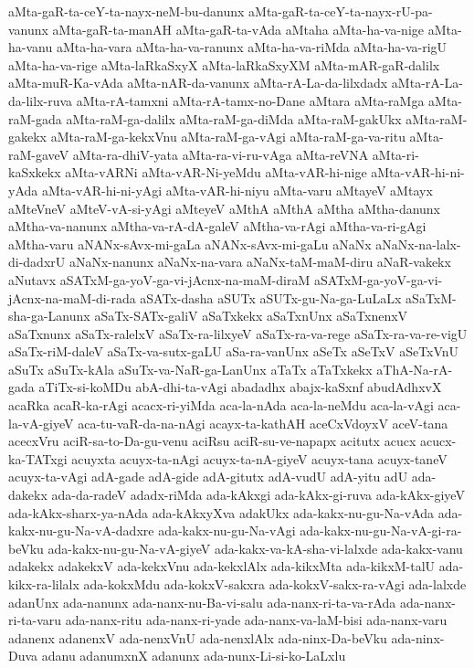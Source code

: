 {aMta-gaR-ta-ceY-ta-nayx-neM-bu-danunx
aMta-gaR-ta-ceY-ta-nayx-rU-pa-vanunx
aMta-gaR-ta-manAH
aMta-gaR-ta-vAda
aMtaha
aMta-ha-va-nige
aMta-ha-vanu
aMta-ha-vara
aMta-ha-va-ranunx
aMta-ha-va-riMda
aMta-ha-va-rigU
aMta-ha-va-rige
aMta-laRkaSxyX
aMta-laRkaSxyXM
aMta-mAR-gaR-dalilx
aMta-muR-Ka-vAda
aMta-nAR-da-vanunx
aMta-rA-La-da-lilxdadx
aMta-rA-La-da-lilx-ruva
aMta-rA-tamxni
aMta-rA-tamx-no-Dane
aMtara
aMta-raMga
aMta-raM-gada
aMta-raM-ga-dalilx
aMta-raM-ga-diMda
aMta-raM-gakUkx
aMta-raM-gakekx
aMta-raM-ga-kekxVnu
aMta-raM-ga-vAgi
aMta-raM-ga-va-ritu
aMta-raM-gaveV
aMta-ra-dhiV-yata
aMta-ra-vi-ru-vAga
aMta-reVNA
aMta-ri-kaSxkekx
aMta-vARNi
aMta-vAR-Ni-yeMdu
aMta-vAR-hi-nige
aMta-vAR-hi-ni-yAda
aMta-vAR-hi-ni-yAgi
aMta-vAR-hi-niyu
aMta-varu
aMtayeV
aMtayx
aMteVneV
aMteV-vA-si-yAgi
aMteyeV
aMthA
aMthA‌
aMtha
aMtha-danunx
aMtha-va-nanunx
aMtha-va-rA-dA-galeV
aMtha-va-rAgi
aMtha-va-ri-gAgi
aMtha-varu
aNANx-sAvx-mi-gaLa
aNANx-sAvx-mi-gaLu
aNaNx
aNaNx-na-lalx-di-dadxrU
aNaNx-nanunx
aNaNx-na-vara
aNaNx-taM-maM-diru
aNaR-vakekx
aNutavx
aSATxM-ga-yoV-ga-vi-jAcnx-na-maM-diraM
aSATxM-ga-yoV-ga-vi-jAcnx-na-maM-di-rada
aSATx-dasha
aSUTx
aSUTx-gu-Na-ga-LuLaLx
aSaTxM-sha-ga-Lanunx
aSaTx-SATx-galiV
aSaTxkekx
aSaTxnUnx
aSaTxnenxV
aSaTxnunx
aSaTx-ralelxV
aSaTx-ra-lilxyeV
aSaTx-ra-va-rege
aSaTx-ra-va-re-vigU
aSaTx-riM-daleV
aSaTx-va-sutx-gaLU
aSa-ra-vanUnx
aSeTx
aSeTxV
aSeTxVnU
aSuTx
aSuTx-kAla
aSuTx-va-NaR-ga-LanUnx
aTaTx
aTaTxkekx
aThA-Na-rA-gada
aTiTx-si-koMDu
abA-dhi-ta-vAgi
abadadhx
abajx-kaSxnf
abudAdhxvX
acaRka
acaR-ka-rAgi
acacx-ri-yiMda
aca-la-nAda
aca-la-neMdu
aca-la-vAgi
aca-la-vA-giyeV
aca-tu-vaR-da-na-nAgi
acayx-ta-kathAH
aceCxVdoyxV
aceV-tana
acecxVru
aciR-sa-to-Da-gu-venu
aciRsu
aciR-su-ve-napapx
acitutx
acucx
acucx-ka-TATxgi
acuyxta
acuyx-ta-nAgi
acuyx-ta-nA-giyeV
acuyx-tana
acuyx-taneV
acuyx-ta-vAgi
adA-gade
adA-gide
adA-gitutx
adA-vudU
adA-yitu
adU
ada-dakekx
ada-da-radeV
adadx-riMda
ada-kAkxgi
ada-kAkx-gi-ruva
ada-kAkx-giyeV
ada-kAkx-sharx-ya-nAda
ada-kAkxyXva
adakUkx
ada-kakx-nu-gu-Na-vAda
ada-kakx-nu-gu-Na-vA-dadxre
ada-kakx-nu-gu-Na-vAgi
ada-kakx-nu-gu-Na-vA-gi-ra-beVku
ada-kakx-nu-gu-Na-vA-giyeV
ada-kakx-va-kA-sha-vi-lalxde
ada-kakx-vanu
adakekx
adakekxV
ada-kekxVnu
ada-kekxlAlx
ada-kikxMta
ada-kikxM-talU
ada-kikx-ra-lilalx
ada-kokxMdu
ada-kokxV-sakxra
ada-kokxV-sakx-ra-vAgi
ada-lalxde
adanUnx
ada-nanunx
ada-nanx-nu-Ba-vi-salu
ada-nanx-ri-ta-va-rAda
ada-nanx-ri-ta-varu
ada-nanx-ritu
ada-nanx-ri-yade
ada-nanx-va-laM-bisi
ada-nanx-varu
adanenx
adanenxV
ada-nenxVnU
ada-nenxlAlx
ada-ninx-Da-beVku
ada-ninx-Duva
adanu
adanumxnX
adanunx
ada-nunx-Li-si-ko-LaLxlu
}
